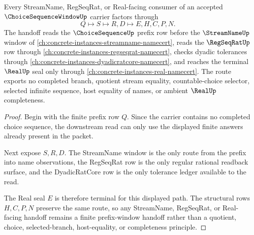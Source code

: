 \begin{theorem}
\label{thm:choice-sequence-window-stream-handoff}
Every StreamName, RegSeqRat, or Real-facing consumer of an accepted $\ChoiceSequenceWindowUp$ carrier factors through
$$
Q \longmapsto S \longmapsto R,D \longmapsto E,H,C,P,N .
$$
The handoff reads the $\ChoiceSequenceUp$ prefix row before the $\StreamNameUp$ window of \autoref{ch:concrete-instances-streamname-namecert}, reads the $\RegSeqRatUp$ row through \autoref{ch:concrete-instances-regseqrat-namecert}, checks dyadic tolerances through \autoref{ch:concrete-instances-dyadicratcore-namecert}, and reaches the terminal $\RealUp$ seal only through \autoref{ch:concrete-instances-real-namecert}. The route exports no completed branch, quotient stream equality, countable-choice selector, selected infinite sequence, host equality of names, or ambient $\RealUp$ completeness.
\end{theorem}
\begin{proof}
Begin with the finite prefix row $Q$. Since the carrier contains no completed choice sequence, the downstream read can only use the displayed finite answers already present in the packet.

Next expose $S,R,D$. The StreamName window is the only route from the prefix into name observations, the RegSeqRat row is the only regular rational readback surface, and the DyadicRatCore row is the only tolerance ledger available to the read.

The Real seal $E$ is therefore terminal for this displayed path. The structural rows $H,C,P,N$ preserve the same route, so any StreamName, RegSeqRat, or Real-facing handoff remains a finite prefix-window handoff rather than a quotient, choice, selected-branch, host-equality, or completeness principle.
\end{proof}


\begin{closurestatus}{\ChoiceSequenceWindowUp}
  \theoryclosure{\seedClosure}
  \formalstatus{\unformalizedV}
\end{closurestatus}
